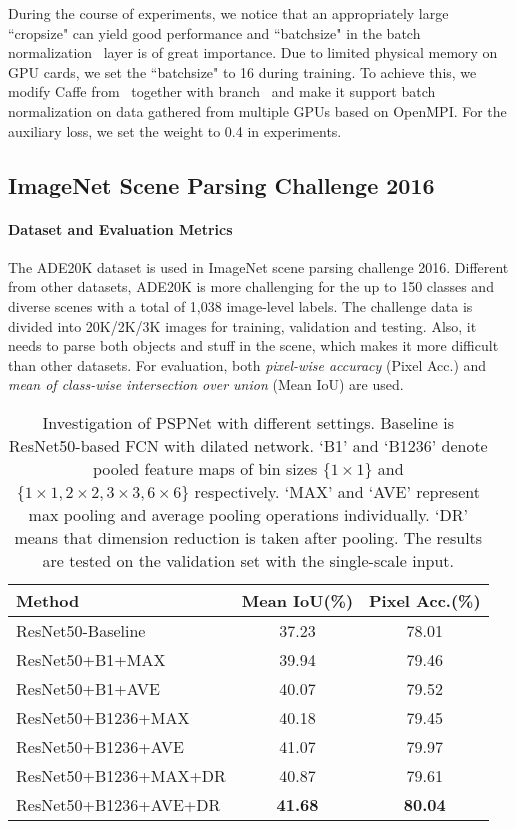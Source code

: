 \documentclass[10pt,twocolumn,letterpaper]{article}
\begin{document}
During the course of experiments, we notice that an appropriately large ``cropsize" can
yield good performance and ``batchsize" in the batch normalization~\cite{ioffe2015batch}
layer is of great importance. Due to limited physical memory on GPU cards, we set the
``batchsize" to 16 during training. To achieve this, we modify Caffe
from~\cite{wang2015towards} together with branch~\cite{chen2016deeplab} and make it
support batch normalization on data gathered from multiple GPUs based on OpenMPI. For the
auxiliary loss, we set the weight to 0.4 in experiments.

\subsection{ImageNet Scene Parsing Challenge 2016}
\label{sec:imagenetexperimet}

\paragraph{Dataset and Evaluation Metrics}
The ADE20K dataset \cite{zhou2016semantic} is used in ImageNet scene parsing challenge
2016. Different from other datasets, ADE20K is more challenging for the up to 150 classes
and diverse scenes with a total of 1,038 image-level labels. The challenge data is
divided into 20K/2K/3K images for training, validation and testing. Also, it needs to
parse both objects and stuff in the scene, which makes it more difficult than other
datasets. For evaluation, both {\it pixel-wise accuracy} (Pixel Acc.) and {\it mean of
class-wise intersection over union} (Mean IoU) are used.

\begin{table}
\footnotesize
\begin{center}
\begin{tabular}{ l c c}
\hline
Method & Mean IoU(\%) & Pixel Acc.(\%) \\
\hline\hline
ResNet50-Baseline & 37.23 & 78.01 \\
ResNet50+B1+MAX & 39.94 & 79.46 \\
ResNet50+B1+AVE & 40.07 & 79.52 \\
ResNet50+B1236+MAX & 40.18 & 79.45 \\
ResNet50+B1236+AVE & 41.07 & 79.97 \\
ResNet50+B1236+MAX+DR & 40.87 & 79.61 \\
ResNet50+B1236+AVE+DR & \textbf{41.68} & \textbf{80.04} \\
\hline
\end{tabular}
\end{center}
\caption{Investigation of PSPNet with different settings. Baseline is ResNet50-based FCN
with dilated network. `B1' and `B1236' denote pooled feature maps of bin sizes $\{1\times
1\}$ and $\{1\times1, 2\times2, 3\times3, 6\times6\}$ respectively. `MAX' and `AVE'
represent max pooling and average pooling operations individually. `DR' means that
dimension reduction is taken after pooling. The results are tested on the validation set
with the single-scale input.} \label{tab:pspnet}
\end{table}
\end{document}
